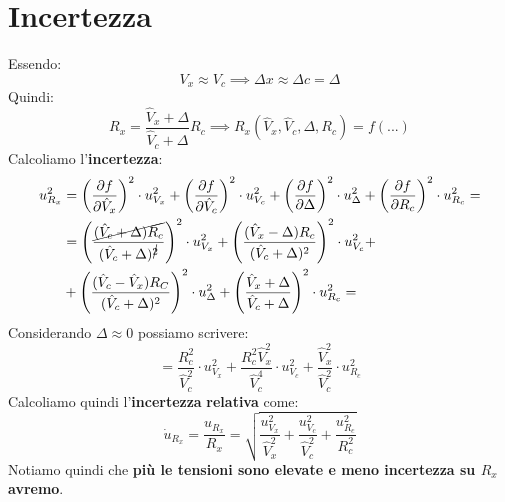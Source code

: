 \section{Incertezza}
Essendo:
\begin{equation*}
    V_x \approx V_c \implies \Delta x \approx \Delta c = \Delta
\end{equation*}
Quindi:
\begin{equation*}
    R_x = \frac{\hat{V}_x + \Delta}{\hat{V}_c +\Delta} R_c \implies R_x(\hat{V}_x , \hat{V}_c, \Delta, R_c) = f(...)
\end{equation*}
Calcoliamo l'\textbf{incertezza}:
\begin{equation*}
    \begin{aligned}
        u^2_{R_x} &= \left(\frac{\partial f}{\partial \hat{V}_x}\right)^2 \cdot u^2_{V_x} + \left(\frac{\partial f}{\partial \hat{V}_c}\right)^2 \cdot u^2_{V_c} + \left(\frac{\partial f}{\partial \Delta}\right)^2 \cdot u^2_{\Delta} + \left(\frac{\partial f}{\partial R_c}\right)^2 \cdot u^2_{R_c} =\\
        &=\left(\frac{\cancel{(\hat{V}_c + \Delta)R_c}}{(\hat{V}_c + \Delta)^{\cancel{2}}}\right)^2 \cdot u^2_{V_x} + \left(\frac{(\hat{V}_x - \Delta)R_c}{(\hat{V}_c + \Delta)^2}\right)^2 \cdot u^2_{V_c} + \\
        &+\left(\frac{(\hat{V}_c - \hat{V}_x) R_C}{(\hat{V}_c + \Delta)^2}\right)^2 \cdot u^2_{\Delta} + \left(\frac{\hat{V}_x + \Delta}{\hat{V}_c + \Delta}\right)^2 \cdot u^2_{R_c} =\\
    \end{aligned}
\end{equation*}
Considerando $\Delta \approx 0$ possiamo scrivere:
\begin{equation*}
    = \frac{R^2_c}{\hat{V}^2_c} \cdot u^2_{V_x} + \frac{R^2_c \hat{V}^2_x}{\hat{V}^4_c} \cdot u^2_{V_c} + \frac{\hat{V}^2_x}{\hat{V}^2_c} \cdot u^2_{R_c}
\end{equation*}
Calcoliamo quindi l'\textbf{incertezza} \textbf{relativa} come:
\begin{equation*}
    \dot{u}_{R_x} = \frac{u_{R_x}}{R_x} = \sqrt{\frac{u^2_{V_x}}{\hat{V}^2_x} + \frac{u^2_{V_c}}{\hat{V}^2_c} + \frac{u^2_{R_c}}{R^2_c}}
\end{equation*}
Notiamo quindi che \textbf{più le tensioni sono elevate e meno incertezza su $R_x$ avremo}.
